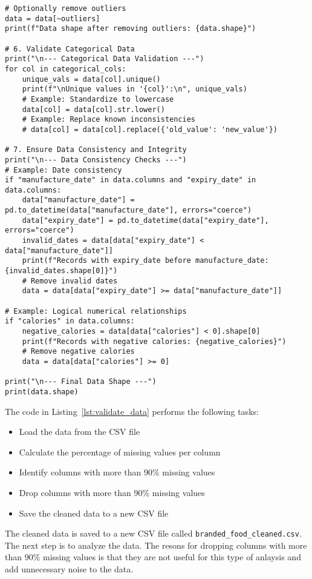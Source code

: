 \begin{lstlisting}[style=pythonStyle, caption={Validate the Data}, label={lst:validate_data}]
# Optionally remove outliers
data = data[~outliers]
print(f"Data shape after removing outliers: {data.shape}")

# 6. Validate Categorical Data
print("\n--- Categorical Data Validation ---")
for col in categorical_cols:
    unique_vals = data[col].unique()
    print(f"\nUnique values in '{col}':\n", unique_vals)
    # Example: Standardize to lowercase
    data[col] = data[col].str.lower()
    # Example: Replace known inconsistencies
    # data[col] = data[col].replace({'old_value': 'new_value'})

# 7. Ensure Data Consistency and Integrity
print("\n--- Data Consistency Checks ---")
# Example: Date consistency
if "manufacture_date" in data.columns and "expiry_date" in data.columns:
    data["manufacture_date"] = pd.to_datetime(data["manufacture_date"], errors="coerce")
    data["expiry_date"] = pd.to_datetime(data["expiry_date"], errors="coerce")
    invalid_dates = data[data["expiry_date"] < data["manufacture_date"]]
    print(f"Records with expiry_date before manufacture_date: {invalid_dates.shape[0]}")
    # Remove invalid dates
    data = data[data["expiry_date"] >= data["manufacture_date"]]

# Example: Logical numerical relationships
if "calories" in data.columns:
    negative_calories = data[data["calories"] < 0].shape[0]
    print(f"Records with negative calories: {negative_calories}")
    # Remove negative calories
    data = data[data["calories"] >= 0]

print("\n--- Final Data Shape ---")
print(data.shape)
\end{lstlisting}


The code in Listing~\ref{lst:validate_data} performs the following tasks:
  \begin{itemize}
      \item Load the data from the CSV file
      \item Calculate the percentage of missing values per column
      \item Identify columns with more than 90\% missing values
      \item Drop columns with more than 90\% missing values
      \item Save the cleaned data to a new CSV file
  \end{itemize}
The cleaned data is saved to a new CSV file called \texttt{branded\_food\_cleaned.csv}. The next step is to analyze the data. The resons for dropping columns with more than 90\% missing values is that they are not useful for this type of anlaysis and add unnecessary noise to the data.


